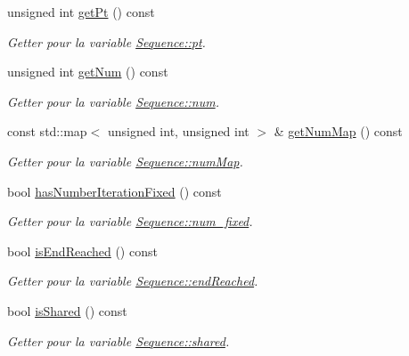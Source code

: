 \begin{DoxyCompactItemize}
unsigned int \hyperlink{class_sequence_af33fa151c98bbf84a28823cd09ee7d9a}{get\+Pt} () const 
\begin{DoxyCompactList}\small\item\em Getter pour la variable \hyperlink{class_sequence_a6005aee7fd142d6292dcfeefe062bc82}{Sequence\+::pt}. \end{DoxyCompactList}\item 
unsigned int \hyperlink{class_sequence_a4cc3d5e3e7d3f289e920aa3e5c9e92ee}{get\+Num} () const 
\begin{DoxyCompactList}\small\item\em Getter pour la variable \hyperlink{class_sequence_a9283bd1da021b06eeaed1028b1e7069e}{Sequence\+::num}. \end{DoxyCompactList}\item 
const std\+::map$<$ unsigned int, unsigned int $>$ \& \hyperlink{class_sequence_abb5f09294c5e976997d1a8350b4d2996}{get\+Num\+Map} () const 
\begin{DoxyCompactList}\small\item\em Getter pour la variable \hyperlink{class_sequence_a3fb6b6543259ea07c976012dd622cdcc}{Sequence\+::num\+Map}. \end{DoxyCompactList}\item 
bool \hyperlink{class_sequence_a32de7afc9fdde5cdacc5ea445b3dd4d3}{has\+Number\+Iteration\+Fixed} () const 
\begin{DoxyCompactList}\small\item\em Getter pour la variable \hyperlink{class_sequence_ae495f3d3267ac936660920ab13b2316e}{Sequence\+::num\+\_\+fixed}. \end{DoxyCompactList}\item 
bool \hyperlink{class_sequence_a294b1ccae843cd2e5da5e240688b514b}{is\+End\+Reached} () const 
\begin{DoxyCompactList}\small\item\em Getter pour la variable \hyperlink{class_sequence_a37ae535e71d53216a85e16bec941410d}{Sequence\+::end\+Reached}. \end{DoxyCompactList}\item 
bool \hyperlink{class_sequence_a7687abf7372c74369a1e892127c3c3fa}{is\+Shared} () const 
\begin{DoxyCompactList}\small\item\em Getter pour la variable \hyperlink{class_sequence_a77c5ea96e0222cb80d5a8cf420e1d624}{Sequence\+::shared}. \end{DoxyCompactList}\item 

\end{DoxyCompactItemize}
